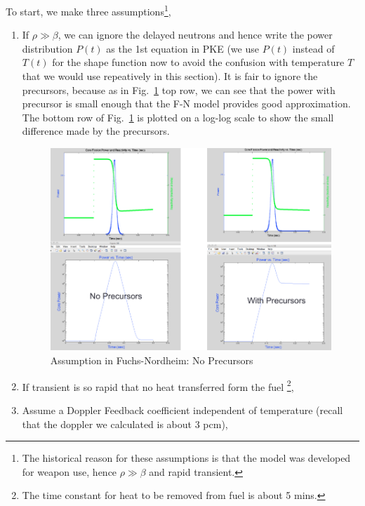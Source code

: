 \documentclass{school-22.211-notes}
\begin{document}
To start, we make three assumptions\footnote{The historical reason for these assumptions is that the model was developed for weapon use, hence $\rho \gg \beta$ and rapid transient.}, 
\begin{enumerate}
\item If $\rho \gg \beta$, we can ignore the delayed neutrons and hence write the power distribution $P(t)$ as the 1st equation in PKE (we use $P(t)$ instead of $T(t)$ for the shape function now to avoid the confusion with temperature $T$ that we would use repeatively in this section). 
  It is fair to ignore the precursors, because as in Fig.~\ref{fn1} top row, we can see that the power with precursor is small enough that the F-N model provides good approximation. The bottom row of Fig.~\ref{fn1} is plotted on a log-log scale to show the small difference made by the precursors.  
\begin{figure}[ht]
  \centering
  \includegraphics[width=6in]{images/pke/fn1.png}
  \caption{Assumption in Fuchs-Nordheim: No Precursors}\label{fn1}
\end{figure}

\item If transient is so rapid that no heat transferred form the fuel \footnote{The time constant for heat to be removed from  fuel is about 5 mins.}, 

\item Assume a Doppler Feedback coefficient independent of temperature (recall that the doppler we calculated is about 3 pcm), 
\end{enumerate}
\end{document}
